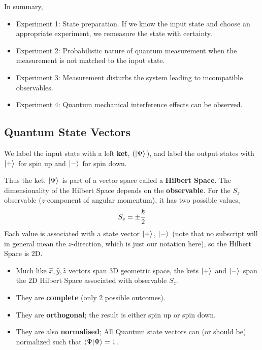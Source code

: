 \documentclass[english, 11pt]{article}
\begin{document}
       In summary,

       \begin{itemize}
         \item Experiment 1: State preparation. If we know the input state and choose an appropriate experiment, we remeasure the state with certainty.
         \item Experiment 2: Probabilistic nature of quantum measurement when the measurement is not matched to the input state.
         \item Experiment 3: Measurement disturbs the system leading to incompatible observables.
         \item Experiment 4: Quantum mechanical interference effects can be observed.
       \end{itemize}

       \subsection{Quantum State Vectors}

         \begin{defn}[Postulate 1]\label{postulate_1}
         We label the input state with a left \textbf{ket}, $(\left| \Psi \rangle \right.$), and label the output states with $\left| + \rangle \right.$ for spin up and $\left| - \rangle \right.$ for spin down.
         \end{defn}

         Thus the ket, $\left| \Psi \rangle \right.$ is part of a vector space called a \textbf{Hilbert Space}. The dimensionality of the Hilbert Space depends on the \textbf{observable}. For the $S_z$ observable ($z$-component of angular momentum), it has two possible values,
         \[ S_z = \pm \frac{\hbar}{2} \]
         Each value is associated with a state vector $\left| + \rangle \right.$, $\left| - \rangle \right.$ (note that no subscript will in general mean the $z$-direction, which is just our notation here), so the Hilbert Space is 2D.

         \begin{itemize}
            \item Much like $\hat{x}, \hat{y}, \hat{z}$ vectors span 3D geometric space, the kets $\left| + \rangle \right.$ and $\left| - \rangle \right.$ span the 2D Hilbert Space associated with observable $S_z$.
            \item They are \textbf{complete} (only 2 possible outcomes).
            \item They are \textbf{orthogonal}; the result is either spin up or spin down.
            \item They are also \textbf{normalised}; All Quantum state vectors can (or should be) normalized such that $\langle \Psi | \Psi \rangle = 1$.
         \end{itemize}
\end{document}
